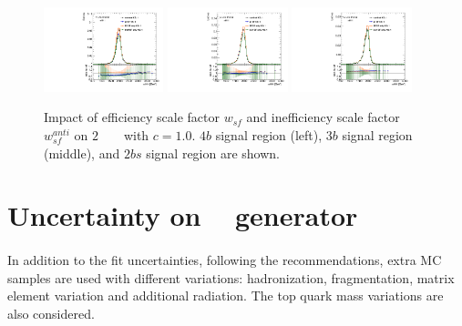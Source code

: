\begin{figure}[htbp!]
\begin{center}
\includegraphics[width=0.31\textwidth,angle=-90]{figures/boosted/AppendixbSF/directcompare_mHH_l_bSF_2000_FT_EFF_Eigen_B_0__1down_TwoTag_split_.pdf}
\includegraphics[width=0.31\textwidth,angle=-90]{figures/boosted/AppendixbSF/directcompare_mHH_l_bSF_2000_FT_EFF_Eigen_B_0__1down_ThreeTag_.pdf}
\includegraphics[width=0.31\textwidth,angle=-90]{figures/boosted/AppendixbSF/directcompare_mHH_l_bSF_2000_FT_EFF_Eigen_B_0__1down_FourTag_.pdf}
\caption{Impact of efficiency scale factor $w_{sf}$ and inefficiency scale factor $w_{sf}^{anti}$ on $2$ \TeV~ \Grav~ with $c=1.0$. $4b$ signal region (left), $3b$ signal region (middle), and $2bs$ signal region are shown.}
\label{fig:signal_bsyst_reduction}
\end{center}
\end{figure}
\section{Uncertainty on \ttbar~ generator}
\label{sec:ttbar-mc-unc}

\paragraph{}
In addition to the \ttbar fit uncertainties, following the recommendations, extra \ttbar MC samples are used with different variations: hadronization, fragmentation, matrix element variation and additional radiation.
The top quark mass variations are also considered. 

